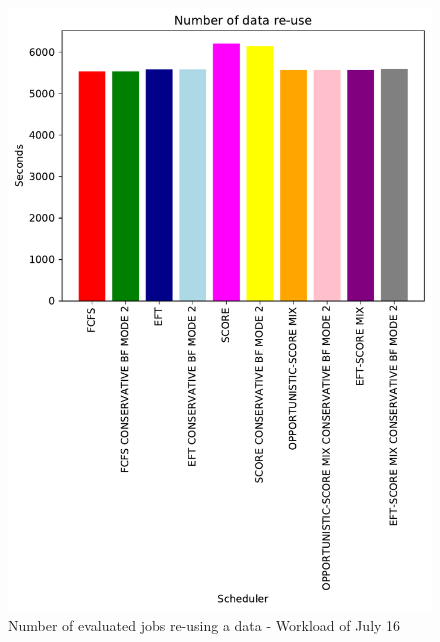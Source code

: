 \documentclass[conference,10pt]{IEEEtran}
\begin{document}
\begin{figure}\centering\includegraphics[width=1\linewidth]{../MBSS/plot/Results_FCFS_Score_Backfill_2022-07-16->2022-07-16_V10000_Number_of_data_reuse_450_128_32_256_4_1024.pdf}\caption{Number of evaluated jobs re-using a data - Workload of July 16}\end{figure}
\end{document}
